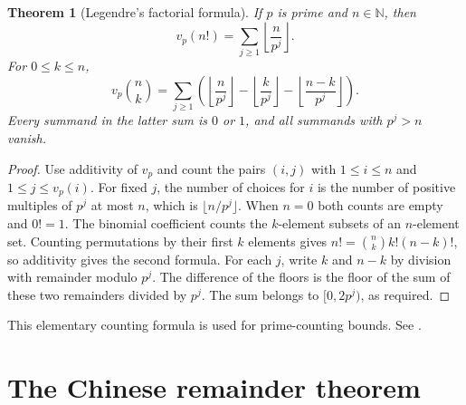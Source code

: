 \documentclass[11pt,oneside,openany]{book}
\theoremstyle{plain}
\newtheorem{theorem}{Theorem}[chapter]
\theoremstyle{definition}
\theoremstyle{remark}
\begin{document}
\begin{theorem}[Legendre's factorial formula]\label{nt:A04}
If $p$ is prime and $n\in\mathbb N$, then
\[
 v_p(n!)=\sum_{j\ge1}\left\lfloor\frac{n}{p^j}\right\rfloor .
\]
For $0\le k\le n$,
\[
 v_p\binom nk
   =\sum_{j\ge1}\left(
       \left\lfloor\frac n{p^j}\right\rfloor
       -\left\lfloor\frac k{p^j}\right\rfloor
       -\left\lfloor\frac{n-k}{p^j}\right\rfloor
     \right).
\]
Every summand in the latter sum is $0$ or $1$, and all summands
with $p^j>n$ vanish.
\end{theorem}
\begin{proof}
Use additivity of $v_p$ and count the pairs $(i,j)$ with
$1\le i\le n$ and $1\le j\le v_p(i)$. For fixed $j$, the number
of choices for $i$ is the number of positive multiples of $p^j$
at most $n$, which is $\lfloor n/p^j\rfloor$. When $n=0$ both
counts are empty and $0!=1$. The binomial coefficient counts the
$k$-element subsets of an $n$-element set. Counting permutations
by their first $k$ elements gives
$n!=\binom nk k!(n-k)!$, so additivity gives the second formula.
For each $j$, write $k$ and $n-k$ by division with remainder
modulo $p^j$. The difference of the floors is the floor of the
sum of these two remainders divided by $p^j$. The sum belongs to
$[0,2p^j)$, as required.
\end{proof}
This elementary counting formula is used for prime-counting
bounds. See \cite[\S8.1]{nzm}.

\section{The Chinese remainder theorem}
\end{document}
